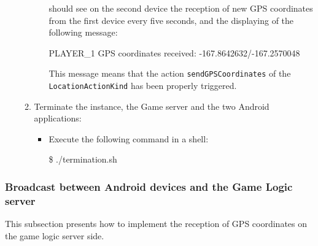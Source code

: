 \begin{enumerate}
\begin{enumerate}
\begin{itemize}
should see on the second device the reception of new GPS coordinates from the 
first device every five seconds, and the displaying of the following message:
\begin{shellcmd}  
PLAYER_1 GPS coordinates received: -167.8642632/-167.2570048
\end{shellcmd}
This message means that the action \texttt{sendGPSCoordinates} of the
\texttt{LocationActionKind} has been properly triggered.
\end{itemize}
\item Terminate the instance, the Game server and the two Android applications:
\begin{itemize}
\item Execute the following command in a shell:
  \begin{shellcmd}  
\$ ./termination.sh
\end{shellcmd}
\end{itemize}
\end{enumerate}
\end{enumerate}

\subsubsection{Broadcast between Android devices and the Game Logic server }
\label{SS_broadcast_gamelogic}
This subsection presents how to implement the reception of GPS
coordinates on the game logic server side.

